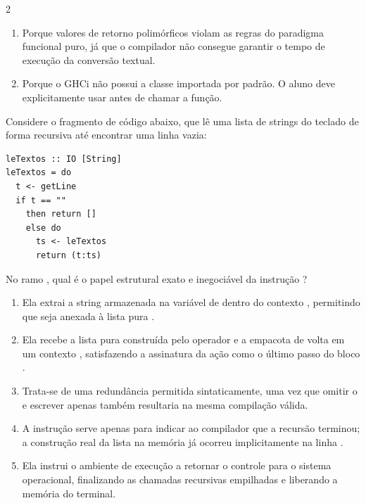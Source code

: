 \documentclass[a4paper,10pt,brazil]{article}
\begin{document}
\begin{multicols}{2}
\begin{enumerate}
  \item Porque valores de retorno polimórficos violam as regras do paradigma funcional puro, já que o compilador não consegue garantir o tempo de execução da conversão textual.

  \item Porque o GHCi não possui a classe  importada por padrão. O aluno deve explicitamente usar  antes de chamar a função.


\end{enumerate}

Considere o fragmento de código abaixo, que lê uma lista de strings do teclado de forma recursiva até encontrar uma linha vazia:

\begin{verbatim}
leTextos :: IO [String]
leTextos = do
  t <- getLine
  if t == "" 
    then return []
    else do
      ts <- leTextos
      return (t:ts)
\end{verbatim}

No ramo , qual é o papel estrutural exato e inegociável da instrução ?

\begin{enumerate}
  \item Ela extrai a string armazenada na variável  de dentro do contexto , permitindo que seja anexada à lista pura .

  \item Ela recebe a lista pura construída pelo operador \haskellinline{(:)} e a empacota de volta em um contexto , satisfazendo a assinatura da ação como o último passo do bloco .

  \item Trata-se de uma redundância permitida sintaticamente, uma vez que omitir o  e escrever apenas  também resultaria na mesma compilação válida.

  \item A instrução  serve apenas para indicar ao compilador que a recursão terminou; a construção real da lista na memória já ocorreu implicitamente na linha .

  \item Ela instrui o ambiente de execução a retornar o controle para o sistema operacional, finalizando as chamadas recursivas empilhadas e liberando a memória do terminal.



\end{enumerate}
\end{multicols}
\end{document}
